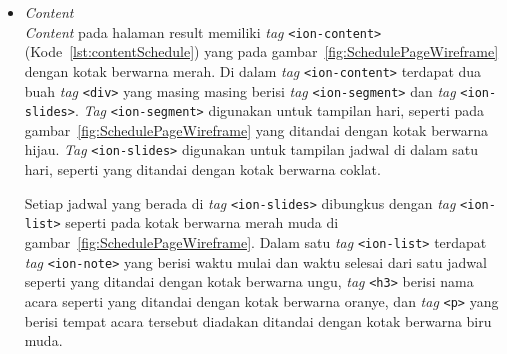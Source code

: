 \begin{enumerate}
\begin{enumerate}
\begin{itemize}
		\item \textit{Content} \\
		\textit{Content} pada halaman result memiliki \textit{tag} \texttt{<ion-content>} (Kode~\ref{lst:contentSchedule}) yang pada gambar~\ref{fig:SchedulePageWireframe} dengan kotak berwarna merah. Di dalam \textit{tag} \texttt{<ion-content>} terdapat dua buah \textit{tag} \texttt{<div>} yang masing masing berisi \textit{tag} \texttt{<ion-segment>} dan \textit{tag} \texttt{<ion-slides>}. \textit{Tag} \texttt{<ion-segment>} digunakan untuk tampilan hari, seperti pada gambar~\ref{fig:SchedulePageWireframe} yang ditandai dengan kotak berwarna hijau. \textit{Tag} \texttt{<ion-slides>} digunakan untuk tampilan jadwal di dalam satu hari, seperti yang ditandai dengan kotak berwarna coklat. 
		
		Setiap jadwal yang berada di \textit{tag} \texttt{<ion-slides>} dibungkus dengan \textit{tag} \texttt{<ion-list>} seperti pada kotak berwarna merah muda di gambar~\ref{fig:SchedulePageWireframe}. Dalam satu \textit{tag} \texttt{<ion-list>} terdapat \textit{tag} \texttt{<ion-note>} yang berisi waktu mulai dan waktu selesai dari satu jadwal seperti yang ditandai dengan kotak berwarna ungu, \textit{tag} \texttt{<h3>} berisi nama acara seperti yang ditandai dengan kotak berwarna oranye, dan \textit{tag} \texttt{<p>} yang berisi tempat acara tersebut diadakan ditandai dengan kotak berwarna biru muda.




\end{itemize}
\end{enumerate}
\end{enumerate}
